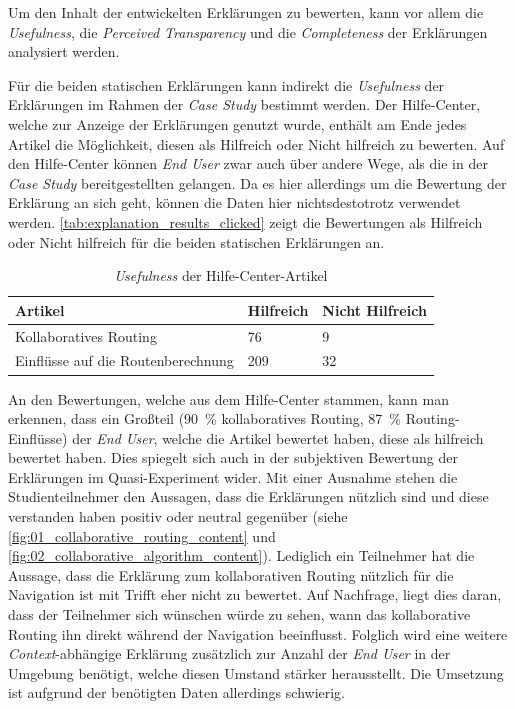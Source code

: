 Um den Inhalt der entwickelten Erklärungen zu bewerten, kann vor allem die \textit{Usefulness}, die \textit{Perceived Transparency} und die \textit{Completeness} der Erklärungen analysiert werden.

Für die beiden statischen Erklärungen kann indirekt die \textit{Usefulness} der Erklärungen im Rahmen der \textit{Case Study} bestimmt werden. Der Hilfe-Center, welche zur Anzeige der Erklärungen genutzt wurde, enthält am Ende jedes Artikel die Möglichkeit, diesen als \glqq Hilfreich\grqq{} oder \glqq Nicht hilfreich\grqq{} zu bewerten. Auf den Hilfe-Center können \textit{End User} zwar auch über andere Wege, als die in der \textit{Case Study} bereitgestellten gelangen. Da es hier allerdings um die Bewertung der Erklärung an sich geht, können die Daten hier nichtsdestotrotz verwendet werden. \autoref{tab:explanation_results_clicked} zeigt die Bewertungen als \glqq Hilfreich\grqq{} oder \glqq Nicht hilfreich\grqq{} für die beiden statischen Erklärungen an.

\begin{table}[htb!]
    \centering
    \begin{tabular}{p{}p{}p{}}
        \hline
        Artikel & Hilfreich & Nicht Hilfreich \\
        \toprule
        Kollaboratives Routing & 76 & 9 \\
        Einflüsse auf die Routenberechnung & 209 & 32 \\
        \bottomrule
    \end{tabular}
    \caption{\textit{Usefulness} der Hilfe-Center-Artikel}
    \label{tab:explanation_results_clicked}
\end{table}

An den Bewertungen, welche aus dem Hilfe-Center stammen, kann man erkennen, dass ein Großteil (90~\% kollaboratives Routing, 87~\% Routing-Einflüsse) der \textit{End User}, welche die Artikel bewertet haben, diese als \glqq hilfreich\grqq{} bewertet haben. Dies spiegelt sich auch in der subjektiven Bewertung der Erklärungen im Quasi-Experiment wider. Mit einer Ausnahme stehen die Studienteilnehmer den Aussagen, dass die Erklärungen nützlich sind und diese verstanden haben positiv oder neutral gegenüber (siehe \autoref{fig:01_collaborative_routing_content} und \autoref{fig:02_collaborative_algorithm_content}). Lediglich ein Teilnehmer hat die Aussage, dass die Erklärung zum kollaborativen Routing nützlich für die Navigation ist mit \glqq Trifft eher nicht zu\grqq{} bewertet. Auf Nachfrage, liegt dies daran, dass der Teilnehmer sich wünschen würde zu sehen, wann das kollaborative Routing ihn direkt während der Navigation beeinflusst. Folglich wird eine weitere \textit{Context}-abhängige Erklärung zusätzlich zur Anzahl der \textit{End User} in der Umgebung benötigt, welche diesen Umstand stärker herausstellt. Die Umsetzung ist aufgrund der benötigten Daten allerdings schwierig.

